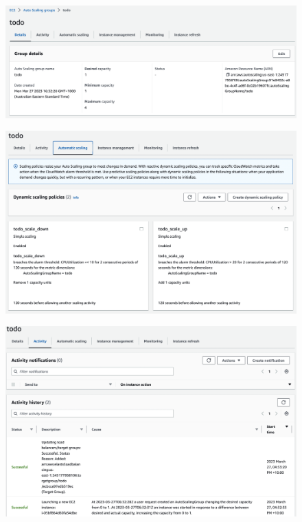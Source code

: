 \documentclass{csse4400}
\begin{document}
\begin{figure}[H]
  \begin{center}
    \includegraphics[width=\textwidth]{images/ec2_4}
  \end{center}
\end{figure}

\begin{figure}[H]
  \begin{center}
    \includegraphics[width=\textwidth]{images/ec2_5}
  \end{center}
\end{figure}

\begin{figure}[H]
  \begin{center}
    \includegraphics[width=\textwidth]{images/ec2_6}
  \end{center}
\end{figure}
\end{document}
